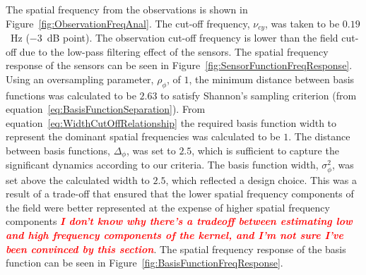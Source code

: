 \documentclass[10pt,a4paper]{article}
\newcommand{\mike}[1]{\textsf{\emph{\textbf{\textcolor{red}{#1}}}}}
\begin{document}
The spatial frequency from the observations is shown in Figure~\ref{fig:ObservationFreqAnal}. The cut-off frequency, $\nu_{cy}$, was taken to be $0.19$~Hz ($-3$~dB point). The observation cut-off frequency is lower than the field cut-off due to the low-pass filtering effect of the sensors. The spatial frequency response of the sensors can be seen in Figure~\ref{fig:SensorFunctionFreqResponse}. Using an oversampling parameter, $\rho_{\phi}$, of $1$, the minimum distance between basis functions was calculated to be $2.63$ to satisfy Shannon's sampling criterion (from equation~\ref{eq:BasisFunctionSeparation}). From equation~\ref{eq:WidthCutOffRelationship} the required basis function width to represent the dominant spatial frequencies was calculated to be $1$. The distance between basis functions, $\Delta_{\phi}$, was set to $2.5$, which is sufficient to capture the significant dynamics according to our criteria. The basis function width, $\sigma_{\phi}^2$, was set above the calculated width to $2.5$, which reflected a design choice. This was a result of a trade-off that ensured that the lower spatial frequency components of the field were better represented at the expense of higher spatial frequency components \mike{I don't know why there's a tradeoff between estimating low and high frequency components of the kernel, and I'm not sure I've been convinced by this section}. The spatial frequency response of the basis function can be seen in Figure~\ref{fig:BasisFunctionFreqResponse}.
\end{document}
